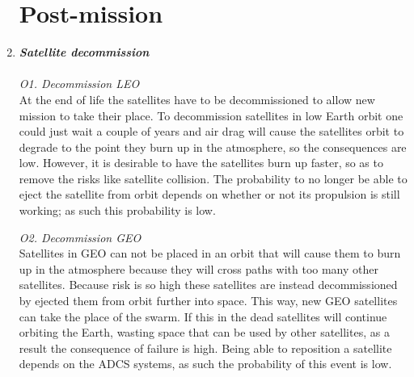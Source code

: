 \begin{enumerate}[A]
\section{Post-mission}
\label{blTRAPm}
	\item\textbf{\textit{Satellite decommission}} \\\\
\textit{O1. Decommission LEO}\\ 
At the end of life the satellites have to be decommissioned to allow new mission to take their place. To decommission satellites in low Earth orbit one could just wait a couple of years and air drag will cause the satellites orbit to degrade to the point they burn up in the atmosphere, so the consequences are low. However, it is desirable to have the satellites burn up faster, so as to remove the risks like satellite collision. The probability to no longer be able to eject the satellite from orbit depends on whether or not its propulsion is still working; as such this probability is low.

\textit{O2. Decommission GEO}\\ 
Satellites in GEO can not be placed in an orbit that will cause them to burn up in the atmosphere because they will cross paths with too many other satellites. Because risk is so high these satellites are instead decommissioned by ejected them from orbit further into space. This way, new GEO satellites can take the place of the swarm. If this in the dead satellites will continue orbiting the Earth, wasting space that can be used by other satellites, as a result the consequence of failure is high. Being able to reposition a satellite depends on the ADCS systems, as such the probability of this event is low.


\end{enumerate}
